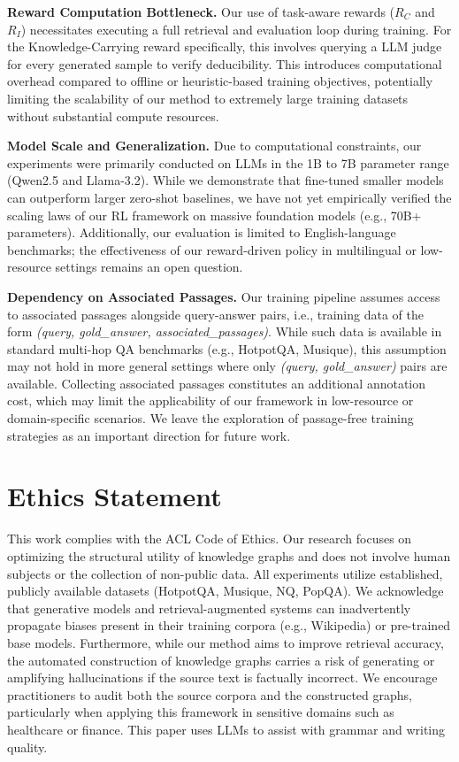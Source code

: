 \documentclass[11pt]{article}
\begin{document}
\textbf{Reward Computation Bottleneck.} Our use of task-aware rewards ($R_C$ and $R_I$) necessitates executing a full retrieval and evaluation loop during training. For the Knowledge-Carrying reward specifically, this involves querying a LLM judge for every generated sample to verify deducibility. This introduces computational overhead compared to offline or heuristic-based training objectives, potentially limiting the scalability of our method to extremely large training datasets without substantial compute resources.

\textbf{Model Scale and Generalization.} Due to computational constraints, our experiments were primarily conducted on LLMs in the 1B to 7B parameter range (Qwen2.5 and Llama-3.2). While we demonstrate that fine-tuned smaller models can outperform larger zero-shot baselines, we have not yet empirically verified the scaling laws of our RL framework on massive foundation models (e.g., 70B+ parameters). Additionally, our evaluation is limited to English-language benchmarks; the effectiveness of our reward-driven policy in multilingual or low-resource settings remains an open question.

\textbf{Dependency on Associated Passages.} Our training pipeline assumes access to associated passages alongside query-answer pairs, i.e., training data of the form \textit{(query, gold\_answer, associated\_passages)}. While such data is available in standard multi-hop QA benchmarks (e.g., HotpotQA, Musique), this assumption may not hold in more general settings where only \textit{(query, gold\_answer)} pairs are available. Collecting associated passages constitutes an additional annotation cost, which may limit the applicability of our framework in low-resource or domain-specific scenarios. We leave the exploration of passage-free training strategies as an important direction for future work.

\section{Ethics Statement}
This work complies with the ACL Code of Ethics. Our research focuses on optimizing the structural utility of knowledge graphs and does not involve human subjects or the collection of non-public data. All experiments utilize established, publicly available datasets (HotpotQA, Musique, NQ, PopQA). We acknowledge that generative models and retrieval-augmented systems can inadvertently propagate biases present in their training corpora (e.g., Wikipedia) or pre-trained base models. Furthermore, while our method aims to improve retrieval accuracy, the automated construction of knowledge graphs carries a risk of generating or amplifying hallucinations if the source text is factually incorrect. We encourage practitioners to audit both the source corpora and the constructed graphs, particularly when applying this framework in sensitive domains such as healthcare or finance. This paper uses LLMs to assist with grammar and writing quality.
\end{document}

